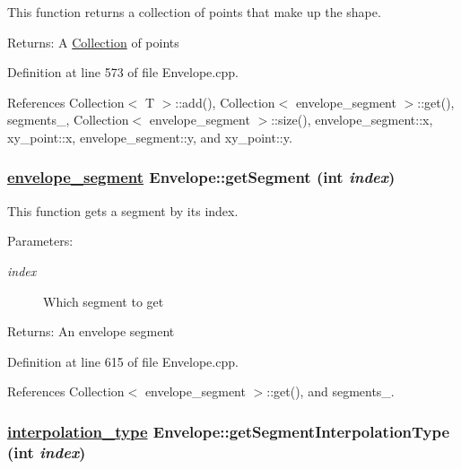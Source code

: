 This function returns a collection of points that make up the shape. \begin{Desc}
\item[Returns:]A \hyperlink{classCollection}{Collection} of points \end{Desc}


Definition at line 573 of file Envelope.cpp.

References Collection$<$ T $>$::add(), Collection$<$ envelope\_\-segment $>$::get(), segments\_\-, Collection$<$ envelope\_\-segment $>$::size(), envelope\_\-segment::x, xy\_\-point::x, envelope\_\-segment::y, and xy\_\-point::y.\hypertarget{classEnvelope_a15}{
\subsubsection[getSegment]{\setlength{\rightskip}{0pt plus 5cm}\hyperlink{structenvelope__segment}{envelope\_\-segment} Envelope::get\-Segment (int {\em index})}}
\label{classEnvelope_a15}


This function gets a segment by its index. \begin{Desc}
\item[Parameters:]
\begin{description}
\item[{\em index}]Which segment to get \end{description}
\end{Desc}
\begin{Desc}
\item[Returns:]An envelope segment \end{Desc}


Definition at line 615 of file Envelope.cpp.

References Collection$<$ envelope\_\-segment $>$::get(), and segments\_\-.\hypertarget{classEnvelope_a24}{
\subsubsection[getSegmentInterpolationType]{\setlength{\rightskip}{0pt plus 5cm}\hyperlink{Types_8h_a13}{interpolation\_\-type} Envelope::get\-Segment\-Interpolation\-Type (int {\em index})}}
\label{classEnvelope_a24}


